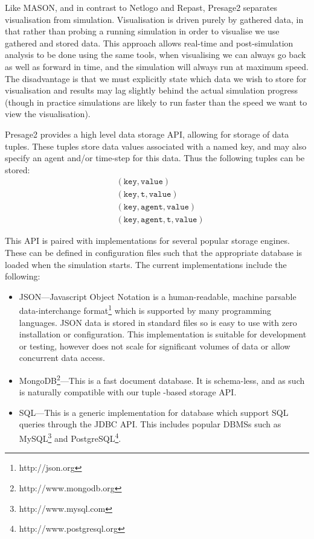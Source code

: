 Like MASON, and in contrast to Netlogo and Repast, Presage2 separates
visualisation from simulation. Visualisation is driven purely by gathered data,
in that rather than probing a running simulation in order to visualise we use
gathered and stored data. This approach allows real-time and post-simulation
analysis to be done using the same tools, when visualising we can always go back
as well as forward in time, and the simulation will always run at maximum speed.
The disadvantage is that we must explicitly state which data we wish to store
for visualisation and results may lag slightly behind the actual simulation
progress (though in practice simulations are likely to run faster than the speed
we want to view the visualisation).

Presage2 provides a high level data storage \ac{API}, allowing for storage of
data tuples. These tuples store data values associated with a named key, and may
also specify an agent and/or time-step for this data. Thus the following tuples
can be stored:
\begin{align*}
&(\mathtt{key},\mathtt{value})\\
&(\mathtt{key},\mathtt{t},\mathtt{value})\\
&(\mathtt{key},\mathtt{agent},\mathtt{value})\\
&(\mathtt{key},\mathtt{agent},\mathtt{t},\mathtt{value})
\end{align*}

This \ac{API} is paired with implementations for several popular storage
engines. These can be defined in configuration files such that the appropriate
database is loaded when the simulation starts. The current implementations
include the following:
\begin{itemize}
	\item JSON---Javascript Object Notation is a human-readable, machine parsable
	data-interchange format\footnote{http://json.org} which is supported by many
	programming languages. JSON data is stored in standard files so is easy to use
	with zero installation or configuration. This implementation is suitable for
	development or testing, however does not scale for significant volumes of data
	or allow concurrent data access.
	\item MongoDB\footnote{http://www.mongodb.org}---This is a fast document
	database. It is schema-less, and as such is naturally compatible with our tuple
	-based storage \ac{API}.
	\item SQL---This is a generic implementation for database which support SQL
	queries through the \ac{JDBC} \ac{API}. This includes popular \acp{DBMS} such
	as MySQL\footnote{http://www.mysql.com} and PostgreSQL\footnote{http://www.postgresql.org}.
\end{itemize}

